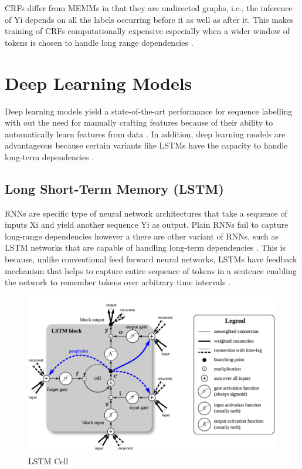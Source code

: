 \ac{CRF}s differ from \ac{MEMM}s in that they are undirected graphs, i.e., the inference of Yi depends on all the labels occurring before it as well as after it. This makes training of CRFs computationally expensive especially when a wider window of tokens is chosen to handle long range dependencies \citep{aggarwal2018machine}. 



\section{Deep Learning Models }
\label{sec:chapter05:MLModels:DLMs}

Deep learning models yield a state-of-the-art performance for sequence labelling with out the need for manually crafting features because of their ability to automatically learn features from data \citep{he2020survey}. In addition, deep learning models are advantageous because certain variants like \ac{LSTM}s have the capacity to handle long-term dependencies \citep{akhundov2018sequence}. 



\subsection{Long Short-Term Memory (\ac{LSTM})}
\label{sec:chapter05:DLModels:LSTM}

\ac{RNN}s are specific type of neural network architectures that take a sequence of inputs Xi and yield another sequence Yi as output. Plain RNNs fail to capture long-range dependencies however a there are other variant of RNNs, such as LSTM networks that are capable of handling long-term dependencies \citep{akhundov2018sequence, lample2016neural}. This is because, unlike conventional feed forward neural networks, LSTMs have feedback mechanism that helps to capture entire sequence of tokens in a sentence enabling the network to remember tokens over arbitrary time intervals \citep{hochreiter1997long}. \\

\begin{figure}[htbp]
	\centering
	\includegraphics[width=.65\textwidth]{4.graphics/figures/ch_5/pdf/LSTM_cell}
	\caption{\ac{LSTM} Cell \citep{ma2016end}}
	\label{fig:chapter03:setup}
\end{figure}


